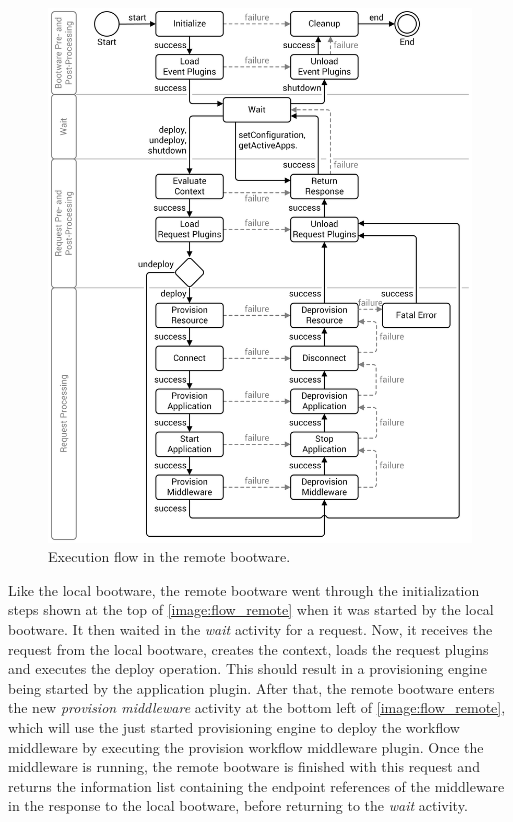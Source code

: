 \begin{figure}[!htbp]
	\centering
	\includegraphics[resolution=600]{design/assets/flow_remote}
	\caption{Execution flow in the remote bootware.}
	\label{image:flow_remote}
\end{figure}

Like the local bootware, the remote bootware went through the initialization steps shown at the top of \autoref{image:flow_remote} when it was started by the local bootware.
It then waited in the \textit{wait} activity for a request.
Now, it receives the request from the local bootware, creates the context, loads the request plugins and executes the deploy operation.
This should result in a provisioning engine being started by the application plugin.
After that, the remote bootware enters the new \textit{provision middleware} activity at the bottom left of \autoref{image:flow_remote}, which will use the just started provisioning engine to deploy the workflow middleware by executing the provision workflow middleware plugin.
Once the middleware is running, the remote bootware is finished with this request and returns the information list containing the endpoint references of the middleware in the response to the local bootware, before returning to the \textit{wait} activity.

